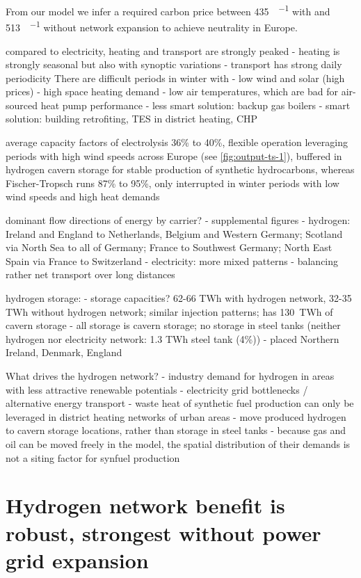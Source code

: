 From our model we infer a required carbon price between
\SI{435}{\sieuro\per\tco} with and \SI{513}{\sieuro\per\tco} without network
expansion to achieve \co neutrality in Europe.

compared to electricity, heating and transport are strongly peaked
- heating is strongly seasonal but also with synoptic variations
- transport has strong daily periodicity
There are difficult periods in winter with
- low wind and solar (high prices)
- high space heating demand
- low air temperatures, which are bad for air-sourced heat pump performance
- less smart solution: backup gas boilers
- smart solution: building retrofiting, TES in district heating, CHP

average capacity factors of electrolysis 36\% to 40\%, flexible operation
leveraging periods with high wind speeds across Europe (see
\cref{fig:output-ts-1}), buffered in hydrogen cavern storage for stable
production of synthetic hydrocarbons, whereas Fischer-Tropsch runs 87\% to 95\%,
only interrupted in winter periods with low wind speeds and high heat demands

dominant flow directions of energy by carrier?
- supplemental figures %
- hydrogen: Ireland and England to Netherlands, Belgium and Western Germany; Scotland via North Sea to all of Germany; France to Southwest Germany; North East Spain via France to Switzerland
- electricity: more mixed patterns - balancing rather net transport over long distances

hydrogen storage:
- storage capacities? 62-66 TWh with hydrogen network, 32-35 TWh without hydrogen network; similar injection patterns; \cite{caglayanImpactDifferent2019} has 130~TWh of cavern storage
- all storage is cavern storage; no storage in steel tanks (neither hydrogen nor electricity network: 1.3 TWh steel tank (4\%))
- placed Northern Ireland, Denmark, England

What drives the hydrogen network?
- industry demand for hydrogen in areas with less attractive renewable potentials
- electricity grid bottlenecks / alternative energy transport
- waste heat of synthetic fuel production can only be leveraged in district heating networks of urban areas
- move produced hydrogen to cavern storage locations, rather than storage in steel tanks
- because gas and oil can be moved freely in the model, the spatial distribution of their demands is not a siting factor for synfuel production

\section*{Hydrogen network benefit is robust, strongest without power grid expansion}
\label{sec:h2}

